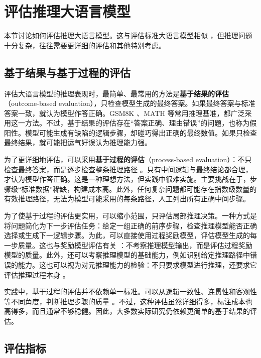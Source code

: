 \section{评估推理大语言模型}

本节讨论如何评估推理大语言模型。这与评估标准大语言模型相似 \cite{chang-etal:2024survey}，但推理问题十分复杂，往往需要更详细的评估和其他特别考虑。

\subsection{基于结果与基于过程的评估}

评估大语言模型的推理表现时，最简单、最常用的方法是\textbf{基于结果的评估}（outcome-based evaluation），只检查模型生成的最终答案。如果最终答案与标准答案一致，就认为模型作答正确。GSM8K \cite{cobbe-etal:2021training}、MATH \cite{hendrycks-etal:2measuring} 等常用推理基准，都广泛采用这一方法。不过，基于结果的评估存在“答案正确、理由错误”的问题，也称为假阳性。模型可能生成有缺陷的逻辑步骤，却碰巧得出正确的最终数值。如果只检查最终结果，就可能把运气好误认为推理能力强。

为了更详细地评估，可以采用\textbf{基于过程的评估}（process-based evaluation）：不只检查最终答案，而是逐步检查整条推理路径 \cite{wang-etal:2024math,xia-etal:2025evaluating}。只有中间逻辑与最终结论都合理，才认为模型作答正确。这是一种理想方法，但实践中很难实施。主要挑战在于，步骤级“标准数据”稀缺，构建成本高。此外，任何复杂问题都可能存在指数级数量的有效推理路径，无法为模型可能采用的每条路径，人工列出所有正确中间步骤。

为了使基于过程的评估更实用，可以缩小范围，只评估局部推理决策。一种方式是将问题简化为下一步评估任务：给定一组正确的前序步骤，检查推理模型能否正确选择或生成下一逻辑步骤。为此，可以直接使用过程奖励模型，评估模型生成的每一步质量。这也与奖励模型评估有关 \cite{lambert-etal:2025rewardbench}：不考察推理模型输出，而是评估过程奖励模型的质量。此外，还可以考察推理模型的基础能力，例如识别给定推理路径中错误的能力。这也可以视为对元推理能力的检验：不只要求模型进行推理，还要求它评估推理过程本身 \cite{zeng-etal:2024mr}。

实践中，基于过程的评估并不依赖单一标准。可以从逻辑一致性、连贯性和客观性等不同角度，判断推理步骤的质量 \cite{lee-and-hockenmaier:2025evaluating}。不过，这种评估虽然详细得多，标注成本也高得多，而且通常不够稳健。因此，大多数实际研究仍依赖更简单的基于结果的评估。

\subsection{评估指标}

